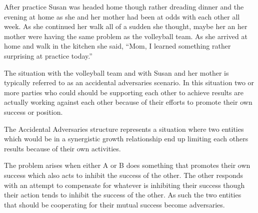 \documentclass[]{memoir}
\begin{document}
After practice Susan was headed home though rather dreading dinner and
the evening at home as she and her mother had been at odds with each
other all week. As she continued her walk all of a sudden she thought,
maybe her an her mother were having the same problem as the volleyball
team. As she arrived at home and walk in the kitchen she said, ``Mom, I
learned something rather surprising at practice today.''

The situation with the volleyball team and with Susan and her mother is
typically referred to as an accidental adversaries scenario. In this
situation two or more parties who could should be supporting each other
to achieve results are actually working against each other because of
their efforts to promote their own success or position.

The Accidental Adversaries structure represents a situation where two
entities which would be in a synergistic growth relationship end up
limiting each others results because of their own activities.

The problem arises when either A or B does something that promotes their
own success which also acts to inhibit the success of the other. The
other responds with an attempt to compensate for whatever is inhibiting
their success though their action tends to inhibit the success of the
other. As such the two entities that should be cooperating for their
mutual success become adversaries.

\FloatBarrier 
\end{document}
